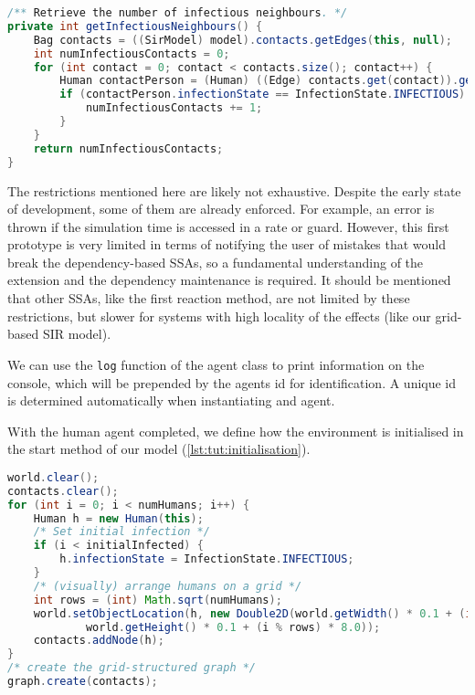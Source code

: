 \documentclass[a4paper, 12pt, bibliography=numbered]{article}
\begin{document}
\begin{lstlisting}[label=lst:tut:infectiousNeighbours,caption={A function for determining the number of infectious contacts of the current agent.},language=Java]
/** Retrieve the number of infectious neighbours. */
private int getInfectiousNeighbours() {
    Bag contacts = ((SirModel) model).contacts.getEdges(this, null);
    int numInfectiousContacts = 0;
    for (int contact = 0; contact < contacts.size(); contact++) {
        Human contactPerson = (Human) ((Edge) contacts.get(contact)).getOtherNode(this);
        if (contactPerson.infectionState == InfectionState.INFECTIOUS) {
            numInfectiousContacts += 1;
        }
    }
    return numInfectiousContacts;
}
\end{lstlisting}

The restrictions mentioned here are likely not exhaustive. Despite the early state of development, some of them are already enforced. For example, an error is thrown if the simulation time is accessed in a rate or guard. However, this first prototype is very limited in terms of notifying the user of mistakes that would break the dependency-based SSAs, so a fundamental understanding of the extension and the dependency maintenance is required. It should be mentioned that other SSAs, like the first reaction method, are not limited by these restrictions, but slower for systems with high locality of the effects (like our grid-based SIR model).

We can use the \texttt{log} function of the agent class to print information on the console, which will be prepended by the agents id for identification. A unique id is determined automatically when instantiating and agent.

With the human agent completed, we define how the environment is initialised in the start method of our model (\autoref{lst:tut:initialisation}).

\begin{lstlisting}[label=lst:tut:initialisation,caption={The initialisation of our environment in the start method of the model.},language=Java]
world.clear();
contacts.clear();
for (int i = 0; i < numHumans; i++) {
    Human h = new Human(this);
    /* Set initial infection */
    if (i < initialInfected) {
        h.infectionState = InfectionState.INFECTIOUS;
    }
    /* (visually) arrange humans on a grid */
    int rows = (int) Math.sqrt(numHumans);
    world.setObjectLocation(h, new Double2D(world.getWidth() * 0.1 + (int) (i / rows) * 8.0,
            world.getHeight() * 0.1 + (i % rows) * 8.0));
    contacts.addNode(h);
}
/* create the grid-structured graph */
graph.create(contacts);
\end{lstlisting}
\end{document}
